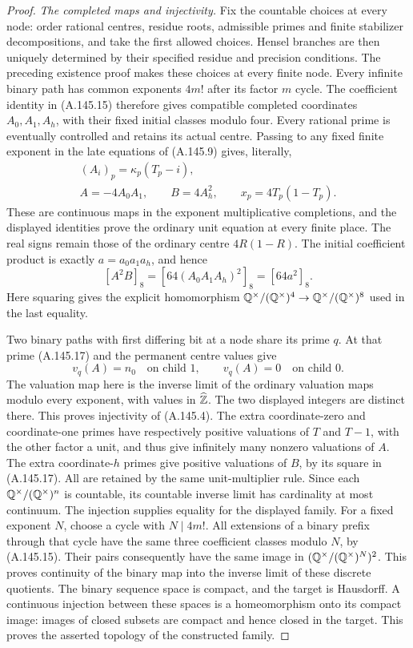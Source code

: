 \begin{proof}
\emph{The completed maps and injectivity.}
Fix the countable choices at every node: order rational
centres, residue roots, admissible primes and finite
stabilizer decompositions, and take the first allowed choices.
Hensel branches are then uniquely determined by their specified
residue and precision conditions.  The preceding existence
proof makes these choices at every finite node.  Every infinite
binary path has common exponents \(4m!\) after its factor
\(m\) cycle.  The coefficient identity in (A.145.15) therefore
gives compatible completed coordinates
\(A_0,A_1,A_h\), with their fixed initial classes modulo four.
Every rational prime is eventually controlled and retains its
actual centre.  Passing to any fixed finite exponent in the
late equations of (A.145.9) gives, literally,
\[
 \begin{gathered}
       (A_i)_p=\kappa_p(T_p-i),\\
       A=-4A_0A_1,\qquad B=4A_h^2,\qquad x_p=4T_p(1-T_p).
 \end{gathered}
\tag{A.145.17}
\]
These are continuous maps in the exponent multiplicative
completions, and the displayed identities prove the ordinary
unit equation at every finite place.  The real signs remain
those of the ordinary centre \(4R(1-R)\).
The initial coefficient product is exactly \(a=a_0a_1a_h\),
and hence
\[
        [A^2B]_8=[64(A_0A_1A_h)^2]_8=[64a^2]_8.
\tag{A.145.18}
\]
Here squaring gives the explicit homomorphism
\(\mathbb Q^\times/(\mathbb Q^\times)^4\to
  \mathbb Q^\times/(\mathbb Q^\times)^8\) used in the last equality.

Two binary paths with first differing bit at a node share
its prime \(q\).  At that prime (A.145.17) and the permanent
centre values give
\[
             v_q(A)=n_0\quad\text{on child }1,
               \qquad v_q(A)=0\quad\text{on child }0.
\tag{A.145.19}
\]
The valuation map here is the inverse limit of the ordinary
valuation maps modulo every exponent, with values in
\(\widehat{\mathbb Z}\).  The two displayed integers are distinct
there.  This proves injectivity of (A.145.4).
The extra coordinate-zero and coordinate-one primes have
respectively positive valuations of \(T\) and \(T-1\),
with the other factor a unit, and thus give infinitely many
nonzero valuations of \(A\).  The extra coordinate-\(h\)
primes give positive valuations of \(B\), by its square in
(A.145.17).  All are retained by the same unit-multiplier rule.
Since each \(\mathbb Q^\times/(\mathbb Q^\times)^n\) is countable, its
countable inverse limit has cardinality at most continuum.
The injection supplies equality for the displayed family.
For a fixed exponent \(N\), choose a cycle with \(N\mid4m!\).
All extensions of a binary prefix through that cycle have
the same three coefficient classes modulo \(N\), by
(A.145.15).  Their pairs consequently have the same image in
\((\mathbb Q^\times/(\mathbb Q^\times)^N)^2\).  This proves continuity
of the binary map into the inverse limit of these discrete
quotients.  The binary sequence space is compact, and the
target is Hausdorff.  A continuous injection between these
spaces is a homeomorphism onto its compact image: images of
closed subsets are compact and hence closed in the target.
This proves the asserted topology of the constructed family.


\end{proof}
